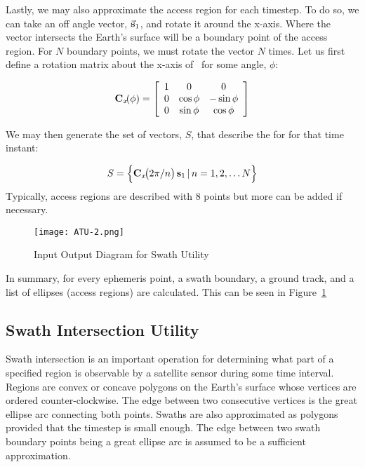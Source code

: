 \newcommand{\Cx}[1]{\ses{C}{x}\!\!\left(#1 \right)}

Lastly, we may also approximate the access region for each timestep. To do so,
we can take an off angle vector, $\vec{\bm{\mathrm{s}}}_{1}$, and rotate it around the
x-axis. Where the vector intersects the Earth's surface will be a boundary
point of the access region. For $N$ boundary points, we must rotate the vector
$N$ times. Let us first define a rotation matrix about the x-axis of \Fo~for
some angle, $\phi$:

\begin{equation}
    \Cx{\phi} = 
    \left[
	\begin{array}{ccc}
	1  & 0 & 0   \\
	0 & \cos\phi  & -\sin\phi   \\
	0 & \sin\phi  & \cos\phi
    \end{array}
    \right]
\end{equation}

We may then generate the set of vectors, $S$, that describe the \gls{for} for
that time instant:

\begin{equation}
    S = \left\{ \Cx{2\pi/n} \ses{s}{1} \, \vert \, n = 1, 2, \ldots N \right\}
\end{equation}
Typically, access regions are described with 8 points but more can be added if
necessary. 


\begin{figure}[h]
    \centering
    \texttt{[image: ATU-2.png]} 
    \caption{Input Output Diagram for Swath Utility}
    \label{fig:atu-2} 
\end{figure}

In summary, for every ephemeris point, a swath boundary, a ground track, and a
list of ellipses (access regions) are calculated. This can be seen in
Figure~\ref{fig:atu-2}


\subsection{Swath Intersection Utility}

Swath intersection is an important operation for determining what part of a
specified region is observable by a satellite sensor during some time interval.
Regions are convex or concave polygons on the Earth’s surface whose vertices
are ordered counter-clockwise. The edge between two consecutive vertices is the
great ellipse arc connecting both points. Swaths are also approximated as
polygons provided that the timestep is small enough. The edge between two swath
boundary points being a great ellipse arc is assumed to be a sufficient
approximation.

